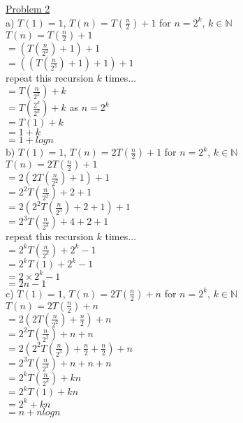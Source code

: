 \documentclass[a4paper,12pt]{article}
\begin{document}
\underline{Problem 2}\\

a) $T(1) = 1$, $T(n) = T(\frac{n}{2}) + 1$ for $n = 2^k$, $k \in \mathbb{N}$\\
\indent \indent $T(n) = T(\frac{n}{2}) + 1$\\
\indent \indent \indent $= (T(\frac{n}{2^2}) + 1) + 1$\\
\indent \indent \indent $=((T(\frac{n}{2^3}) + 1) +1) + 1$\\
\indent \indent \indent repeat this recursion $k$ times...\\
\indent \indent \indent $=T(\frac{n}{2^k}) + k$\\
\indent \indent \indent $=T(\frac{2^k}{2^k}) + k$ as $n = 2^k$\\
\indent \indent \indent $=T(1) + k$\\
\indent \indent \indent $=1 + k$\\
\indent \indent \indent $=1 + log{n}$\\

b) $T(1) = 1$, $T(n) = 2T(\frac{n}{2}) + 1$ for $n = 2^k$, $k \in \mathbb{N}$\\
\indent\indent $T(n) = 2T(\frac{n}{2}) + 1$\\
\indent\indent\indent $= 2(2T(\frac{n}{2^2}) + 1) + 1$\\
\indent\indent\indent $= 2^2T(\frac{n}{2^2}) + 2 + 1$\\
\indent\indent\indent $= 2(2^2T(\frac{n}{2^3}) + 2 + 1) + 1$\\
\indent\indent\indent $= 2^3T(\frac{n}{2^3}) + 4 + 2 + 1$\\
\indent \indent \indent repeat this recursion $k$ times...\\
\indent\indent\indent $= 2^kT(\frac{n}{2^k}) + 2^k - 1$\\
\indent\indent\indent $= 2^kT(1) + 2^k - 1$\\
\indent\indent\indent $= 2 \times 2^k - 1$\\
\indent\indent\indent $= 2n - 1$\\

c) $T(1) = 1$, $T(n) = 2T(\frac{n}{2}) + n$ for $n = 2^k$, $k \in \mathbb{N}$\\
\indent\indent $T(n) = 2T(\frac{n}{2}) + n$\\
\indent\indent\indent $= 2(2T(\frac{n}{2^2}) + \frac{n}{2}) + n$\\
\indent\indent\indent $= 2^2T(\frac{n}{2^2}) + n + n$\\
\indent\indent\indent $= 2(2^2T(\frac{n}{2^3}) + \frac{n}{2} + \frac{n}{2}) + n$\\
\indent\indent\indent $= 2^3T(\frac{n}{2^3}) + n + n + n$\\
\indent\indent\indent $= 2^kT(\frac{n}{2^k}) + kn$\\
\indent\indent\indent $= 2^kT(1) + kn$\\
\indent\indent\indent $= 2^k + kn$\\
\indent\indent\indent $= n + nlog{n}$\\
\end{document}
